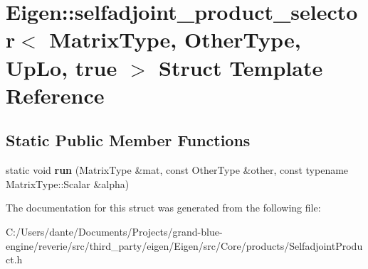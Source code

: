 \hypertarget{struct_eigen_1_1selfadjoint__product__selector_3_01_matrix_type_00_01_other_type_00_01_up_lo_00_01true_01_4}{}\section{Eigen\+::selfadjoint\+\_\+product\+\_\+selector$<$ Matrix\+Type, Other\+Type, Up\+Lo, true $>$ Struct Template Reference}
\label{struct_eigen_1_1selfadjoint__product__selector_3_01_matrix_type_00_01_other_type_00_01_up_lo_00_01true_01_4}
\subsection*{Static Public Member Functions}
\begin{DoxyCompactItemize}
\item 
\mbox{\label{struct_eigen_1_1selfadjoint__product__selector_3_01_matrix_type_00_01_other_type_00_01_up_lo_00_01true_01_4_a7ed6fd3bf80ebbb7f2bd50c7e01bec1f}} 
static void {\bfseries run} (Matrix\+Type \&mat, const Other\+Type \&other, const typename Matrix\+Type\+::\+Scalar \&alpha)
\end{DoxyCompactItemize}


The documentation for this struct was generated from the following file\+:\begin{DoxyCompactItemize}
\item 
C\+:/\+Users/dante/\+Documents/\+Projects/grand-\/blue-\/engine/reverie/src/third\+\_\+party/eigen/\+Eigen/src/\+Core/products/Selfadjoint\+Product.\+h\end{DoxyCompactItemize}
